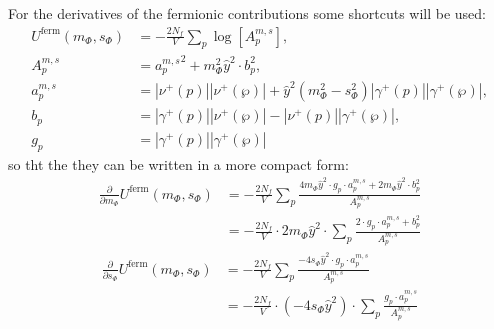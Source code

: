 For the derivatives of the fermionic contributions some shortcuts will be used:
\begin{align}\label{eq:CEP_ferionicContribution_shortcuts}
 U^{\text{ferm}}(m_{\Phi}, s_{\Phi}) &= -\frac{2N_f}{V} \sum\limits_p \log\left[{A_p^{m, s}}\right],
                    \\ \label{eq:CEP_ferionicContribution_shortcuts_A}
 {A_p^{m, s}} &= {a_p^{m,s}}^2 +  m_{\Phi}^2 \hat y^2 \cdot b_p^2 ,
                    \\ \label{eq:CEP_ferionicContribution_shortcuts_a}
 {a_p^{m,s}} &= |\nu^+(p)| |\nu^+(\wp)|   +   \hat y ^2 \left( m_{\Phi}^2 - s_{\Phi}^2 \right) |\gamma^+(p)| |\gamma^+(\wp)|,
                    \\ \label{eq:CEP_ferionicContribution_shortcuts_b}
 b_p                     &= |\gamma^+(p)| |\nu^+(\wp)|   -   |\nu^+(p)| |\gamma^+(\wp)|, 
                    \\ \label{eq:CEP_ferionicContribution_shortcuts_g}
 g_p                     &=  |\gamma^+(p)| |\gamma^+(\wp)|
\end{align}
so tht the they can be written in a more compact form:
\begin{align}\label{eq:CEP_derivative_dm_fermionicContribution}
 \frac{\partial }{\partial m_{\Phi}} U^{\text{ferm}}(m_{\Phi}, s_{\Phi}) &= -\frac{2N_f}{V} \sum\limits_p
                   \frac{4 m_{\Phi} \hat y^2 \cdot g_p \cdot {a_p^{m,s}}   +   2 m_{\Phi} \hat y^2 \cdot b_p^2}
                   { {A_p^{m, s}} } 
       \nonumber \\
%                    
            &= -\frac{2N_f}{V} \cdot 2 m_{\Phi} \hat y^2 \cdot \sum\limits_p 
                   \frac{2 \cdot g_p \cdot {a_p^{m,s}} + b_p^2}{ {A_p^{m, s}} }
\end{align} 
\begin{align}\label{eq:CEP_derivative_ds_fermionicContribution}
 \frac{\partial }{\partial s_{\Phi}} U^{\text{ferm}}(m_{\Phi}, s_{\Phi}) &= -\frac{2N_f}{V} \sum\limits_p
                   \frac{- 4 s_{\Phi} \hat y^2 \cdot g_p \cdot {a_p^{m,s}} }
                   { {A_p^{m, s}} } 
       \nonumber \\
%                    
            &= -\frac{2N_f}{V} \cdot \left( -4 s_{\Phi} \hat y^2\right) \cdot \sum\limits_p 
                   \frac{ g_p \cdot {a_p^{m,s}} }{ {A_p^{m, s}} }
\end{align} 
